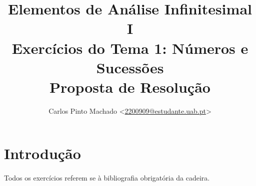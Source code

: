 \documentclass[11pt, a4paper]{article}
\title{
	Elementos de Análise Infinitesimal I\\
	Exercícios do Tema 1: Números e Sucessões\\
	Proposta de Resolução
}
\author{
	Carlos Pinto Machado
	<\href{mailto:2200909@estudante.uab.pt}{2200909@estudante.uab.pt}>
}
\begin{document}
\maketitle

\section*{Introdução}
{}

\paragraph{} Todos os exercícios referem se à bibliografia obrigatória da
cadeira\parencite{Santos2016}.

\vspace{1cm}


%
%
%

\clearpage

\printbibliography[title={Bibliografia},heading=bibintoc]
\end{document}
